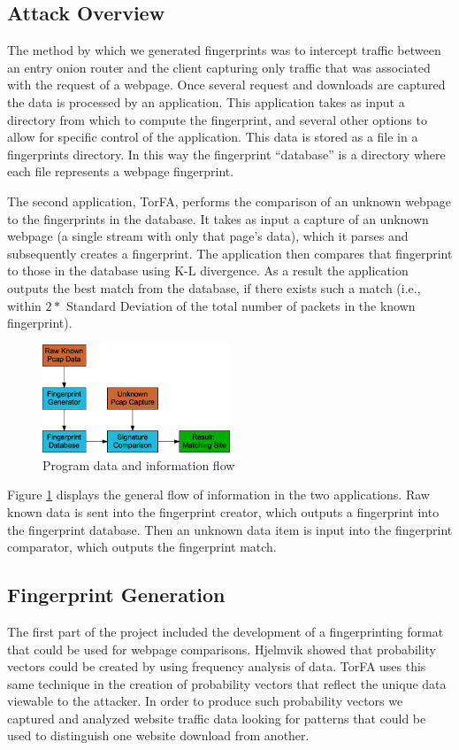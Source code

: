 \documentclass{usenixsubmit}
\begin{document}
\subsection{Attack Overview}
The method by which we generated fingerprints was to intercept traffic 
between an entry onion router and the client capturing only traffic that was associated
with the request of a webpage. Once several request and downloads are 
captured the data is processed by an application. This application takes 
as input a directory from which to compute the fingerprint, and several 
other options to allow for specific control of the application. This data
is stored as a file in a fingerprints directory. In this way the fingerprint
``database'' is a directory where each file represents a webpage fingerprint. 

The second application, TorFA, performs the comparison of an unknown webpage 
to the fingerprints in the database. It takes as input a capture of an unknown
webpage (a single stream with only that page's data), which it parses and 
subsequently creates a fingerprint. The application then compares that 
fingerprint to those in the database using K-L divergence. As a result the 
application outputs the best match from the database, if there exists such a match 
(i.e., within $2 *$ Standard Deviation of the total number of packets in the 
known fingerprint). 

\begin{figure}
	\centering
		\includegraphics[width=0.5\textwidth]{programFlow.png}
	\caption{Program data and information flow}
	\label{fig:programFlow}
\end{figure}

Figure \ref{fig:programFlow} displays the general flow of information in the 
two applications. Raw known data is sent into the fingerprint creator, 
which outputs a fingerprint into the fingerprint database. Then an unknown
data item is input into the fingerprint comparator, which outputs the 
fingerprint match. 

\subsection{Fingerprint Generation}
The first part of the project included the development of a fingerprinting 
format that could be used for webpage comparisons. Hjelmvik \cite{spid}
showed that probability vectors could be created by using frequency 
analysis of data. TorFA uses this 
same technique in the creation of probability vectors that reflect the unique
data viewable to the attacker. In order to produce such probability vectors
we captured and analyzed website traffic data looking for
patterns that could be used to distinguish one website download from another. 
\end{document}
